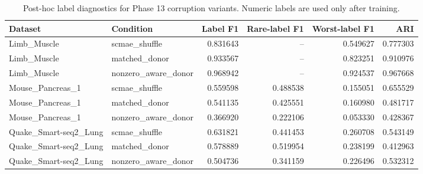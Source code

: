 \begin{table}[ht]
\centering
\caption{Post-hoc label diagnostics for Phase 13 corruption variants. Numeric labels are used only after training.}
\label{tab:generated-phase13-posthoc-labels}
\begin{tabular}{llrrrr}
\toprule
Dataset & Condition & Label F1 & Rare-label F1 & Worst-label F1 & ARI \\
\midrule
Limb\_Muscle & scmae\_shuffle & 0.831643 & -- & 0.549627 & 0.777303 \\
Limb\_Muscle & matched\_donor & 0.933567 & -- & 0.823251 & 0.910976 \\
Limb\_Muscle & nonzero\_aware\_donor & 0.968942 & -- & 0.924537 & 0.967668 \\
Mouse\_Pancreas\_1 & scmae\_shuffle & 0.559598 & 0.488538 & 0.155051 & 0.655529 \\
Mouse\_Pancreas\_1 & matched\_donor & 0.541135 & 0.425551 & 0.160980 & 0.481717 \\
Mouse\_Pancreas\_1 & nonzero\_aware\_donor & 0.366920 & 0.222106 & 0.053330 & 0.428367 \\
Quake\_Smart-seq2\_Lung & scmae\_shuffle & 0.631821 & 0.441453 & 0.260708 & 0.543149 \\
Quake\_Smart-seq2\_Lung & matched\_donor & 0.578889 & 0.519954 & 0.238199 & 0.412963 \\
Quake\_Smart-seq2\_Lung & nonzero\_aware\_donor & 0.504736 & 0.341159 & 0.226496 & 0.532312 \\
\bottomrule
\end{tabular}
\end{table}
